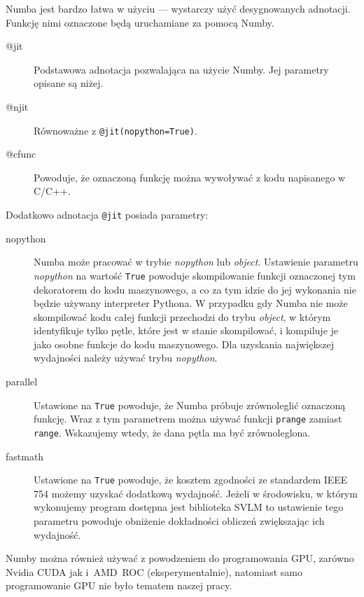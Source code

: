 Numba jest bardzo łatwa w użyciu --- wystarczy użyć desygnowanych
adnotacji.
Funkcję nimi oznaczone będą uruchamiane za pomocą Numby.
\begin{description}
    \item[@jit]
    Podstawowa adnotacja pozwalająca na użycie Numby.
    Jej parametry opisane są niżej.
    \item[@njit]
    Równoważne z \texttt{@jit(nopython=True)}.
    \item[@cfunc]
    Powoduje, że oznaczoną funkcję można wywoływać z kodu napisanego w C/C++.
\end{description}
Dodatkowo adnotacja \texttt{@jit} posiada parametry:
\begin{description}
    \item [nopython]
    Numba może pracować w trybie \textit{nopython} lub \textit{object}.
    Ustawienie parametru \textit{nopython} na wartość \texttt{True}
    powoduje skompilowanie
    funkcji oznaczonej tym dekoratorem do kodu maszynowego, a co za tym idzie
    do jej wykonania nie będzie używany interpreter Pythona.
    W przypadku gdy Numba nie może skompilować kodu całej funkcji
    przechodzi do trybu \textit{object}, w którym identyfikuje tylko pętle,
    które jest w stanie skompilować, i kompiluje je jako osobne funkcje
    do kodu maszynowego.
    Dla uzyskania największej wydajności należy używać trybu \textit{nopython}.
    \item [parallel]
    Ustawione na \texttt{True} powoduje, że Numba próbuje
    zrównoleglić oznaczoną funkcję.
    Wraz z tym parametrem można używać funkcji \texttt{prange}
    zamiast \texttt{range}.
    Wskazujemy wtedy, że dana pętla ma być zrównoleglona.
    \item [fastmath]
    Ustawione na \texttt{True} powoduje, że kosztem zgodności
    ze standardem IEEE 754 możemy uzyskać dodatkową wydajność.
    Jeżeli w środowisku, w którym wykonujemy program dostępna jest
    biblioteka SVLM to ustawienie tego parametru powoduje obniżenie
    dokładności obliczeń zwiększając ich wydajność.
\end{description}

Numby można również używać z powodzeniem do programowania GPU,
zarówno Nvidia CUDA jak i~AMD~ROC (eksperymentalnie),
natomiast samo programowanie GPU nie było tematem naszej pracy.
